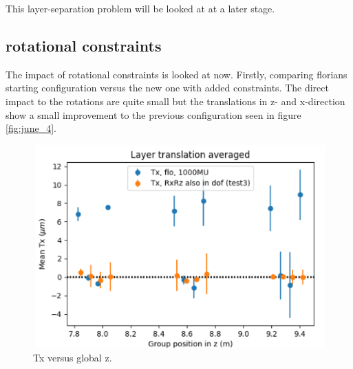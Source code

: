 This layer-separation problem will be looked at at a later stage.

\subsection{rotational constraints}
The impact of rotational constraints is looked at now. Firstly, comparing
florians starting configuration versus the new one with added constraints.
The direct impact to the rotations are quite small but the translations
in z- and x-direction show a small improvement to the previous configuration
seen in figure \ref{fig:june_4}.

\begin{figure}
  \centering
  \includegraphics[width=\textwidth]{plots/july_28/Tx.png}
  \caption{Tx versus global z.}
\end{figure}


